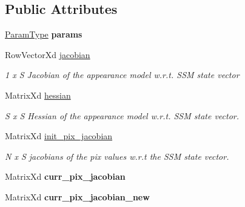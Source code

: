 \subsection*{Public Attributes}
\begin{DoxyCompactItemize}
\item 
\hypertarget{classFCLK_adad325d145a4cf9f0c41c0667be1a336}{\hyperlink{structFCLKParams}{Param\-Type} {\bfseries params}}\label{classFCLK_adad325d145a4cf9f0c41c0667be1a336}

\item 
\hypertarget{classFCLK_a777a27f6007e54b927e24a97ef9ed9ac}{Row\-Vector\-Xd \hyperlink{classFCLK_a777a27f6007e54b927e24a97ef9ed9ac}{jacobian}}\label{classFCLK_a777a27f6007e54b927e24a97ef9ed9ac}

\begin{DoxyCompactList}\small\item\em 1 x S Jacobian of the appearance model w.\-r.\-t. S\-S\-M state vector \end{DoxyCompactList}\item 
\hypertarget{classFCLK_ac629b1e7f1a5f06630520ee0211c50d3}{Matrix\-Xd \hyperlink{classFCLK_ac629b1e7f1a5f06630520ee0211c50d3}{hessian}}\label{classFCLK_ac629b1e7f1a5f06630520ee0211c50d3}

\begin{DoxyCompactList}\small\item\em S x S Hessian of the appearance model w.\-r.\-t. S\-S\-M state vector. \end{DoxyCompactList}\item 
\hypertarget{classFCLK_a3ef0d3c279c07129b0608d88ab33b186}{Matrix\-Xd \hyperlink{classFCLK_a3ef0d3c279c07129b0608d88ab33b186}{init\-\_\-pix\-\_\-jacobian}}\label{classFCLK_a3ef0d3c279c07129b0608d88ab33b186}

\begin{DoxyCompactList}\small\item\em N x S jacobians of the pix values w.\-r.\-t the S\-S\-M state vector. \end{DoxyCompactList}\item 
\hypertarget{classFCLK_a5057c409c97bd8b00860c7a1b07e7d1c}{Matrix\-Xd {\bfseries curr\-\_\-pix\-\_\-jacobian}}\label{classFCLK_a5057c409c97bd8b00860c7a1b07e7d1c}

\item 
\hypertarget{classFCLK_acda983da6ae75475480a14b76698b9d5}{Matrix\-Xd {\bfseries curr\-\_\-pix\-\_\-jacobian\-\_\-new}}\label{classFCLK_acda983da6ae75475480a14b76698b9d5}


\end{DoxyCompactItemize}
